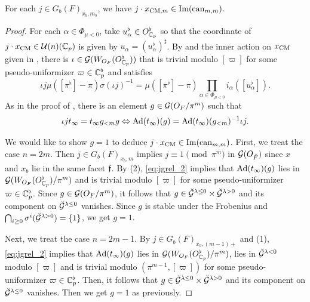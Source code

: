 \documentclass[12pt,reqno]{amsart}
\begin{document}
\begin{lem} \label{lem:intermediate_image_x_CM}
    For each $j \in G_b(F)_{x_b, m_b}$, we have $j \cdot x_{{\operatorname{CM}}, m} \in {\operatorname{Im}}({\operatorname{can}}_{m, m})$. 
\end{lem}
\begin{proof}
    For each $\alpha \in \Phi_{\mu < 0}$, take $u_\alpha^\flat \in O_{\mathbb{C}_p}^\flat$ so that the coordinate of $j \cdot x_{\operatorname{CM}} \in {\mathcal{U}}(n)(\mathbb{C}_p)$ is given by $u_\alpha = (u_\alpha^\flat)^\sharp$. By  and the inner action on $x_{\operatorname{CM}}$ given in \cite[Remark 2.11, Proposition 2.15]{Tak25z}, there is $\iota \in {\mathcal{G}}(W_{O_F}(O_{\mathbb{C}_p}^\flat))$ that is trivial modulo $[\varpi]$ for some pseudo-uniformizer $\varpi \in \mathbb{C}_p^\flat$ and satisfies 
    \[
        \iota j \mu([\pi^\flat] - \pi) \sigma(\iota j)^{-1} = \mu([\pi^\flat]-\pi) \prod_{\alpha \in \Phi_{\mu<0}} i_\alpha([u_\alpha^\flat]). 
    \]
    As in the proof of , there is an element $g \in {\mathcal{G}}(O_F / \pi^m)$ such that 
    \begin{equation} \label{eq:jgrel_2}
        \iota j t_\infty = t_\infty g_{<m} g \Leftrightarrow {\operatorname{Ad}}(t_\infty)(g) = {\operatorname{Ad}}(t_\infty)(g_{<m})^{-1} \iota j.  
    \end{equation}

    We would like to show $g = 1$ to deduce $j \cdot x_{\operatorname{CM}} \in {\operatorname{Im}}({\operatorname{can}}_{m, m})$. First, we treat the case $n = 2m$. Then $j \in G_b(F)_{x_b, m}$ implies $j \equiv 1 \pmod{\pi^m}$ in ${\mathcal{G}}(O_{\breve{F}})$ since $x$ and $x_b$ lie in the same facet ${\mathfrak{f}}$. By  (2), \eqref{eq:jgrel_2} implies that ${\operatorname{Ad}}(t_\infty)(g)$ lies in ${\mathcal{G}}(W_{O_F}(O_{\mathbb{C}_p}^\flat) / \pi^m)$ and is trivial modulo $[\varpi]$ for some pseudo-uniformizer $\varpi \in \mathbb{C}_p^\flat$. Since $g \in {\mathcal{G}}(O_F / \pi^m)$, it follows that $g \in {\mathcal{\breve{G}}}^{\lambda \leq 0} \times {\mathcal{\breve{G}}}^{\lambda > 0}$ and its component on ${\mathcal{\breve{G}}}^{\lambda \leq 0}$ vanishes. Since $g$ is stable under the Frobenius and $\bigcap_{i \geq 0} \sigma^i({\mathcal{\breve{G}}}^{\lambda > 0}) = \{ 1 \}$, we get $g = 1$. 

    Next, we treat the case $n = 2m - 1$. By $j \in G_b(F)_{x_b, (m-1)+}$ and  (1), \eqref{eq:jgrel_2} implies that ${\operatorname{Ad}}(t_\infty)(g)$ lies in ${\mathcal{G}}(W_{O_F}(O_{\mathbb{C}_p}^\flat) / \pi^m)$, lies in ${\mathcal{\breve{G}}}^{\lambda < 0}$ modulo $[\varpi]$ and is trivial modulo $(\pi^{m-1}, [\varpi])$ for some pseudo-uniformizer $\varpi \in \mathbb{C}_p^\flat$. Then, it follows that $g \in {\mathcal{\breve{G}}}^{\lambda \leq 0} \times {\mathcal{\breve{G}}}^{\lambda > 0}$ and its component on ${\mathcal{\breve{G}}}^{\lambda \leq 0}$ vanishes. Then we get $g = 1$ as previously. 
\end{proof}
\end{document}
